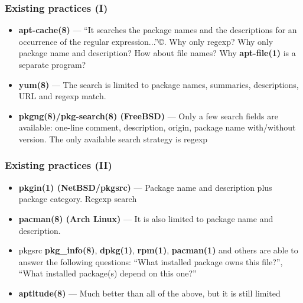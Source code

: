 \documentclass[hyperref=unicode,ascii,xcolor=dvipsnames]{beamer}
\begin{document}

\begin{frame}[fragile]
  \frametitle{Existing practices (I)}
  \begin{itemize}
  \item {\bf apt-cache(8)} --- ``It searches the package names and the
    descriptions for an occurrence of the regular
    expression...''\copyright. Why only regexp? Why only package name
    and description? How about file names? Why {\bf apt-file(1)} is a separate program?
  \item {\bf yum(8)} --- The search is limited to package names, summaries,
    descriptions, URL and regexp match.
  \item {\bf pkgng(8)/pkg-search(8) (FreeBSD)} --- Only a few search fields
    are available: one-line comment, description, origin, package name
    with/without version. The only available search strategy is regexp
  \end{itemize}
\end{frame}


\begin{frame}[fragile]
  \frametitle{Existing practices (II)}
  \begin{itemize}
  \item {\bf pkgin(1) (NetBSD/pkgsrc)} --- Package name and description plus
    package category. Regexp search
  \item {\bf pacman(8) (Arch Linux)} --- It is also limited to package
    name and description.
  \item pkgsrc {\bf pkg\_info(8)}, {\bf dpkg(1)}, {\bf rpm(1)}, {\bf
    pacman(1)} and others are able to answer the following questions:
    ``What installed package owns this file?'', ``What installed
    package(s) depend on this one?''
  \item {\bf aptitude(8)} --- Much better than all of the above, but it is still limited
  \end{itemize}
\end{frame}

\end{document}
